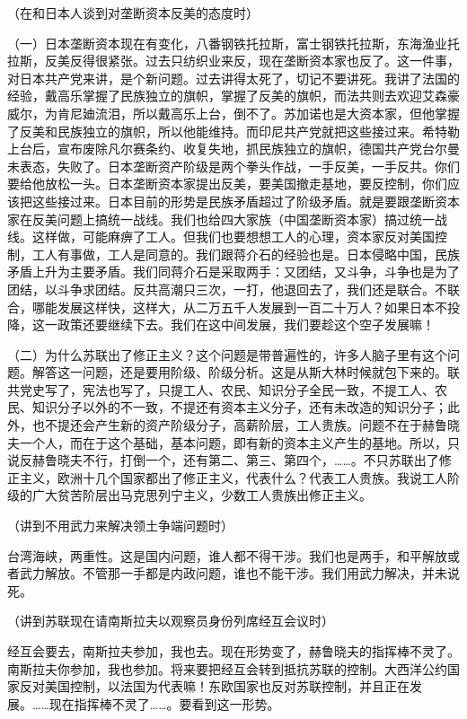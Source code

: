 （在和日本人谈到对垄断资本反美的态度时）

（一）日本垄断资本现在有变化，八番钢铁托拉斯，富士钢铁托拉斯，东海渔业托拉斯，反美反得很紧张。过去只纺织业来反，现在垄断资本家也反了。这一件事，对日本共产党来讲，是个新问题。过去讲得太死了，切记不要讲死。我讲了法国的经验，戴高乐掌握了民族独立的旗帜，掌握了反美的旗帜，而法共则去欢迎艾森豪威尔，为肯尼廸流泪，所以戴高乐上台，倒不了。苏加诺也是大资本家，但他掌握了反美和民族独立的旗帜，所以他能维持。而印尼共产党就把这些接过来。希特勒上台后，宣布废除凡尔赛条约、收复失地，抓民族独立的旗帜，德国共产党台尔曼未表态，失败了。日本垄断资产阶级是两个拳头作战，一手反美，一手反共。你们要给他放松一头。日本垄断资本家提出反美，要美国撤走基地，要反控制，你们应该把这些接过来。日本目前的形势是民族矛盾超过了阶级矛盾。就是要跟垄断资本家在反美问题上搞统一战线。我们也给四大家族（中国垄断资本家）搞过统一战线。这样做，可能麻痹了工人。但我们也要想想工人的心理，资本家反对美国控制，工人有事做，工人是同意的。我们跟蒋介石的经验也是。日本侵略中国，民族矛盾上升为主要矛盾。我们同蒋介石是采取两手：又团结，又斗争，斗争也是为了团结，以斗争求团结。反共高潮只三次，一打，他退回去了，我们还是联合。不联合，哪能发展这样快，这样大，从二万五千人发展到一百二十万人？如果日本不投降，这一政策还要继续下去。我们在这中间发展，我们要趁这个空子发展嘛！

（二）为什么苏联出了修正主义？这个问题是带普遍性的，许多人脑子里有这个问题。解答这一问题，还是要用阶级、阶级分析。这是从斯大林时候就包下来的。联共党史写了，宪法也写了，只提工人、农民、知识分子全民一致，不提工人、农民、知识分子以外的不一致，不提还有资本主义分子，还有未改造的知识分子；此外，也不提还会产生新的资产阶级分子，高薪阶层，工人贵族。问题不在于赫鲁晓夫一个人，而在于这个基础，基本问题，即有新的资本主义产生的基地。所以，只说反赫鲁晓夫不行，打倒一个，还有第二、第三、第四个，……。不只苏联出了修正主义，欧洲十几个国家都出了修正主义，代表什么？代表工人贵族。我说工人阶级的广大贫苦阶层出马克思列宁主义，少数工人贵族出修正主义。

（讲到不用武力来解决领土争端问题时）

台湾海峡，两重性。这是国内问题，谁人都不得干涉。我们也是两手，和平解放或者武力解放。不管那一手都是内政问题，谁也不能干涉。我们用武力解决，并未说死。

（讲到苏联现在请南斯拉夫以观察员身份列席经互会议时）

经互会要去，南斯拉夫参加，我也去。现在形势变了，赫鲁晓夫的指挥棒不灵了。南斯拉夫你参加，我也参加。将来要把经互会转到抵抗苏联的控制。大西洋公约国家反对美国控制，以法国为代表嘛！东欧国家也反对苏联控制，并且正在发展。……现在指挥棒不灵了……。要看到这一形势。


